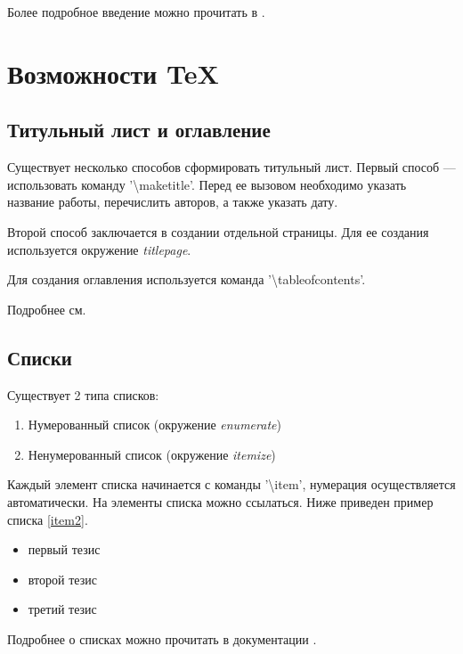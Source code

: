 Более подробное введение можно прочитать в \cite{latexWikibook}.

\section{Возможности TeX}
\subsection{Титульный лист и оглавление}
Существует несколько способов сформировать титульный лист.
Первый способ --- использовать команду '{\textbackslash}maketitle'.
Перед ее вызовом необходимо указать название работы, перечислить авторов, а также указать дату.

Второй способ заключается в создании отдельной страницы.
Для ее создания используется окружение {\em titlepage}.

Для создания оглавления используется команда '{\textbackslash}tableofcontents'.

Подробнее см. \cite{latexTitle,latexTOC}

\subsection{Списки}
Существует 2 типа списков:
\begin{enumerate}
\item Нумерованный список (окружение {\em enumerate})
\item \label{item2}
  Ненумерованный список (окружение {\em itemize})
\end{enumerate}

Каждый элемент списка начинается с команды '{\textbackslash}item', нумерация осуществляется автоматически.
На элементы списка можно ссылаться.
Ниже приведен пример списка \ref{item2}.

\begin{itemize}
\item первый тезис
\item второй тезис
\item третий тезис
\end{itemize}

Подробнее о списках можно прочитать в документации \cite{latexLists}.

